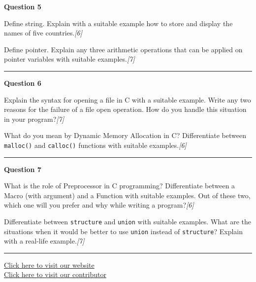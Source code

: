 \documentclass[11pt,a4paper]{article}
\newcommand{\pts}[1]{\hfill   \textit{[#1]}}
\begin{document}
\noindent   \textbf{Question 5}

\begin{parts}
  \item Define string. Explain with a suitable example how to store and display the names of five countries.\pts{6}
  \item Define pointer. Explain any three arithmetic operations that can be applied on pointer variables with suitable examples.\pts{7}
\end{parts}

\medskip\rule{\linewidth}{0.2pt}\medskip




\noindent   \textbf{Question 6}

\begin{parts}
  \item Explain the syntax for opening a file in C with a suitable example. Write any two reasons for the failure of a file open operation. How do you handle this situation in your program?\pts{7}
  \item What do you mean by Dynamic Memory Allocation in C? Differentiate between   \texttt{malloc()} and   \texttt{calloc()} functions with suitable examples.\pts{6}
\end{parts}

\medskip\rule{\linewidth}{0.2pt}\medskip




\noindent   \textbf{Question 7}

\begin{parts}
  \item What is the role of Preprocessor in C programming? Differentiate between a Macro (with argument) and a Function with suitable examples. Out of these two, which one will you prefer and why while writing a program?\pts{6}
  \item Differentiate between   \texttt{structure} and   \texttt{union} with suitable examples. What are the situations when it would be better to use   \texttt{union} instead of   \texttt{structure}? Explain with a real-life example.\pts{7}
\end{parts}

\vfill\rule{\linewidth}{0.4pt}

\begin{center}\small
\href{https://bhu-exam.vercel.app/}{Click here to visit our website}\\[4pt]
\href{https://me-aryan.vercel.app/}{Click here to visit our contributor}
\end{center}
\end{document}
